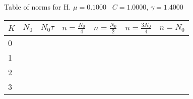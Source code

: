 \begin{center}
Table of norms for H. $\mu = 0.1000$ \, $C = 1.0000$, $\gamma = 1.4000$
  
\begin{tabular}{|p{0.8in}|p{0.8in}|p{0.8in}|p{0.8in}|p{0.8in}|p{0.8in}|p{0.8in}|} \hline
$K$ &$N_0$ &$N_0 \tau$ &$n = \frac{N_0}{4}$ &$n = \frac{N_0}{2}$ &$n = \frac{3N_0}{4}$ &$n = N_0$ \\ \hline 
0 & & & & & & \\ \hline 
1 & & & & & & \\ \hline 
2 & & & & & & \\ \hline 
3 & & & & & & \\ \hline 

\end{tabular}\\[20pt]
\end{center}

